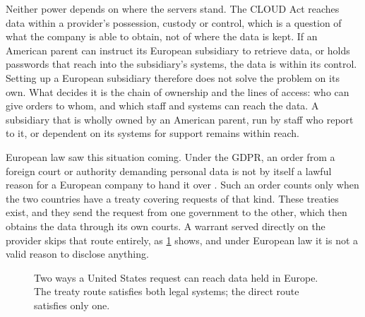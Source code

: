 Neither power depends on where the servers stand. The \ac{CLOUD Act} reaches data
within a provider's possession, custody or control, which is a question of what the
company is able to obtain, not of where the data is kept. If an American parent can
instruct its European subsidiary to retrieve data, or holds passwords that reach
into the subsidiary's systems, the data is within its control. Setting up a
European subsidiary therefore does not solve the problem on its own. What decides
it is the chain of ownership and the lines of access: who can give orders to whom,
and which staff and systems can reach the data. A subsidiary that is wholly owned
by an American parent, run by staff who report to it, or dependent on its systems
for support remains within reach.

European law saw this situation coming. Under the \ac{GDPR}, an order from a
foreign court or authority demanding personal data is not by itself a lawful
reason for a European company to hand it over \cite{GDPR2016}. Such an order counts
only when the two countries have a treaty covering requests of that kind. These
treaties exist, and they send the request from one government to the other, which
then obtains the data through its own courts. A warrant served directly on the
provider skips that route entirely, as \cref{fig:law-collision} shows, and under
European law it is not a valid reason to disclose anything.

\begin{figure}[htbp]
  \centering
  \caption{Two ways a United States request can reach data held in Europe. The
           treaty route satisfies both legal systems; the direct route satisfies
           only one.}
  \label{fig:law-collision}
\end{figure}

